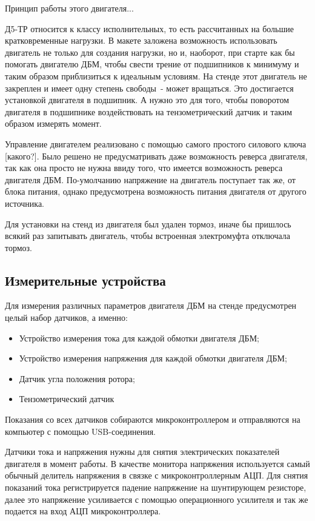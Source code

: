 Принцип работы этого двигателя...

Д5-ТР относится к классу исполнительных, то есть рассчитанных на большие 
кратковременные нагрузки. В макете заложена возможность использовать двигатель не только для
создания нагрузки, но и, наоборот, при старте как бы помогать двигателю ДБМ, чтобы
свести трение от подшипников к минимуму и таким образом приблизиться к идеальным условиям.
На стенде этот двигатель не закреплен и имеет одну степень свободы~- может вращаться. Это
достигается установкой двигателя в подшипник. А нужно это для того, чтобы поворотом двигателя в 
подшипнике воздействовать на тензометрический датчик и таким образом измерять момент.

Управление двигателем реализовано с помощью самого простого силового ключа [какого?].
Было решено не предусматривать даже возможность реверса двигателя, так как она просто не нужна
ввиду того, что имеется возможность реверса двигателя ДБМ. По-умолчанию напряжение на двигатель 
поступает так же, от блока питания, однако предусмотрена возможность питания двигателя от другого 
источника.

Для установки на стенд из двигателя был удален тормоз, иначе бы пришлось всякий раз 
запитывать двигатель, чтобы встроенная электромуфта отключала тормоз.

\subsection{Измерительные устройства}

Для измерения различных параметров двигателя ДБМ на стенде предусмотрен целый набор датчиков,
а именно:

\begin{itemize}
  \item Устройство измерения тока для каждой обмотки двигателя ДБМ;
  \item Устройство измерения напряжения для каждой обмотки двигателя ДБМ;
  \item Датчик угла положения ротора;
  \item Тензометрический датчик
\end{itemize}

Показания со всех датчиков собираются микроконтроллером и отправляются на компьютер
с помощью USB-соединения.

Датчики тока и напряжения нужны для снятия электрических показателей двигателя в момент работы.
В качестве монитора напряжения используется самый обычный делитель напряжения в связке
с микроконтроллерным АЦП. Для снятия показаний тока регистрируется падение напряжение на 
шунтирующем резисторе, далее это напряжение усиливается с помощью операционного усилителя и так же
подается на вход АЦП микроконтроллера.

